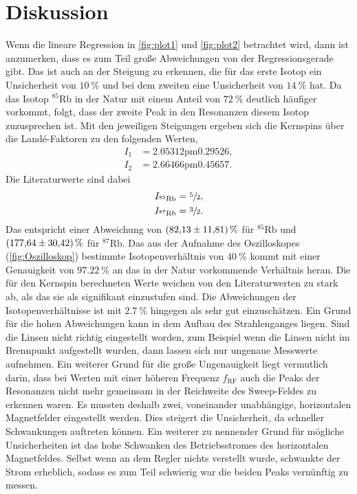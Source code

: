 \section{Diskussion}
\label{sec:Diskussion}

Wenn die lineare Regression in \autoref{fig:plot1} und \autoref{fig:plot2} betrachtet wird, dann ist anzumerken, dass es zum Teil große Abweichungen von der Regressionsgerade gibt.
Das ist auch an der Steigung zu erkennen, die für das erste Isotop ein Unsicherheit von $\SI{10}{\percent}$ und bei dem zweiten eine Unsicherheit von $\SI{14}{\percent}$ hat.
Da das Isotop $^{85}\text{Rb}$ in der Natur mit einem Anteil von $\SI{72}{\percent}$ deutlich häufiger vorkommt, folgt, dass der zweite Peak in den Resonanzen diesem Isotop 
zuzusprechen ist. Mit den jeweiligen Steigungen ergeben sich die Kernspins über die Landé-Faktoren zu den folgenden Werten,
\begin{align*}
    I_1 &= \si{2.05312 \pm 0.29526}, \\
    I_2 &= \si{2.66466 \pm 0.45657}.
\end{align*}
Die Literaturwerte \cite{RubidiumSpin} sind dabei
\begin{align*}
    I_{^{85}\text{Rb}} &= \sfrac52, \\
    I_{^{87}\text{Rb}} &= \sfrac32.
\end{align*}
Das entspricht einer Abweichung von $\SI{82.13\pm 11.81}{\percent}$ für $^{85}\text{Rb}$ und $\SI{177.64\pm 30.42}{\percent}$ für $^{87}\text{Rb}$. 
Das aus der Aufnahme des Oszilloskopes (\ref{fig:Oszilloskop}) bestimmte Isotopenverhältnis von  $\SI{40}{\percent}$ kommt mit einer Genauigkeit von $\SI{97.22}{\percent}$ an das in
der Natur vorkommende Verhältnis heran.
Die für den Kernspin berechneten Werte weichen von den Literaturwerten zu stark ab, als das sie als signifikant einzustufen sind. Die Abweichungen der Isotopenverhältnisse ist mit $\SI{2.7}{\percent}$ hingegen als sehr gut einzuschätzen.
Ein Grund für die hohen Abweichungen kann in dem Aufbau des Strahlenganges liegen. Sind die Linsen nicht richtig eingestellt worden, zum Beispiel wenn die Linsen nicht im Brennpunkt aufgestellt wurden, dann
lassen sich nur ungenaue Messwerte aufnehmen.
Ein weiterer Grund für die große Ungenauigkeit liegt vermutlich darin, dass bei Werten mit einer höheren Frequenz $f_{\text{RF}}$ auch die Peaks der Resonanzen nicht mehr gemeinsam
in der Reichweite des Sweep-Feldes zu erkennen waren. Es mussten deshalb zwei, voneinander unabhängige, horizontalen Magnetfelder eingestellt werden. Dies steigert die Unsicherheit, da
schneller Schwankungen auftreten können.
Ein weiterer zu nennender Grund für mögliche Unsicherheiten ist das hohe Schwanken des Betriebsstromes des horizontalen Magnetfeldes. Selbst wenn an dem Regler nichts verstellt wurde,
schwankte der Strom erheblich, sodass es zum Teil schwierig war die beiden Peaks vernünftig zu messen.